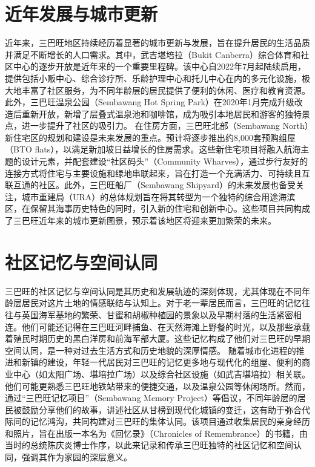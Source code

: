 \documentclass[11pt,a4paper,twoside,openany]{book}
\begin{document}
\section{近年发展与城市更新}
近年来，三巴旺地区持续经历着显著的城市更新与发展，旨在提升居民的生活品质并满足不断增长的人口需求。其中，武吉堪培拉（Bukit Canberra）综合体育和社区中心的逐步开放是近年来的一个重要里程碑。该中心自2022年7月起陆续启用，提供包括小贩中心、综合诊疗所、乐龄护理中心和托儿中心在内的多元化设施，极大地丰富了社区服务，为不同年龄层的居民提供了便利的休闲、医疗和教育资源。此外，三巴旺温泉公园（Sembawang Hot Spring Park）在2020年1月完成升级改造后重新开放，新增了层叠式温泉池和咖啡馆，成为吸引本地居民和游客的独特景点，进一步提升了社区的吸引力。
在住房方面，三巴旺北部（Sembawang North）新住宅区的规划和建设是未来发展的重点。预计将逐步推出约8,000套预购组屋（BTO flats），以满足新加坡日益增长的住房需求。这些新住宅项目将融入航海主题的设计元素，并配套建设“社区码头”（Community Wharves），通过步行友好的连接方式将住宅与主要设施和绿地串联起来，旨在打造一个充满活力、可持续且互联互通的社区。此外，三巴旺船厂（Sembawang Shipyard）的未来发展也备受关注，城市重建局（URA）的总体规划旨在将其转型为一个独特的综合用途海滨区，在保留其海事历史特色的同时，引入新的住宅和创新中心。这些项目共同构成了三巴旺近年来的城市更新图景，预示着该地区将迎来更加繁荣的未来。

\section{社区记忆与空间认同}
三巴旺的社区记忆与空间认同是其历史和发展轨迹的深刻体现，尤其体现在不同年龄层居民对这片土地的情感联结与认知上。对于老一辈居民而言，三巴旺的记忆往往与英国海军基地的繁荣、甘蜜和胡椒种植园的景象以及早期村落的生活紧密相连。他们可能还记得在三巴旺河畔捕鱼、在天然海滩上野餐的时光，以及那些承载着殖民时期历史的黑白洋房和前海军部大厦。这些记忆构成了他们对三巴旺的早期空间认同，是一种对过去生活方式和历史地貌的深厚情感。
随着城市化进程的推进和新镇的建设，年轻一代居民对三巴旺的记忆更多地与现代化的组屋、便利的商业中心（如太阳广场、堪培拉广场）以及综合社区设施（如武吉堪培拉）相关联。他们可能更熟悉三巴旺地铁站带来的便捷交通，以及温泉公园等休闲场所。然而，通过“三巴旺记忆项目”（Sembawang Memory Project）等倡议，不同年龄层的居民被鼓励分享他们的故事，讲述社区从甘榜到现代化城镇的变迁，这有助于弥合代际间的记忆鸿沟，共同构建对三巴旺的集体认同。该项目通过收集居民的亲身经历和照片，旨在出版一本名为《回忆录》（Chronicles of Remembrance）的书籍，由当时的总统陈庆炎博士作序，以此来记录和传承三巴旺独特的社区记忆和空间认同，强调其作为家园的深层意义。
\end{document}
